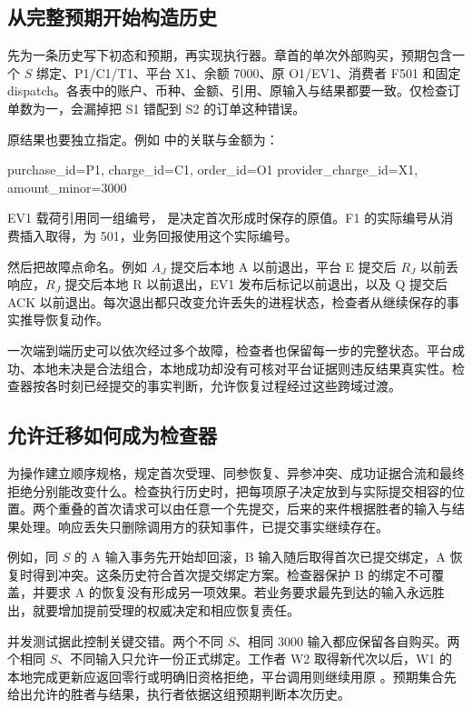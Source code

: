 \subsection*{从完整预期开始构造历史}

先为一条历史写下初态和预期，再实现执行器。章首的单次外部购买，预期包含一个 $S$ 绑定、P1/C1/T1、平台 X1、余额 7000、原 O1/EV1、消费者 F501 和固定 dispatch。各表中的账户、币种、金额、引用、原输入与结果都要一致。仅检查订单数为一，会漏掉把 S1 错配到 S2 的订单这种错误。

原结果也要独立指定。例如  中的关联与金额为：
\begin{BookCode}
purchase_id=P1, charge_id=C1, order_id=O1
provider_charge_id=X1, amount_minor=3000
\end{BookCode}
EV1 载荷引用同一组编号， 是决定首次形成时保存的原值。F1 的实际编号从消费插入取得，为 501，业务回报使用这个实际编号。

然后把故障点命名。例如 $A_J$ 提交后本地 A 以前退出，平台 E 提交后 $R_J$ 以前丢响应，$R_J$ 提交后本地 R 以前退出，EV1 发布后标记以前退出，以及 Q 提交后 ACK 以前退出。每次退出都只改变允许丢失的进程状态，检查者从继续保存的事实推导恢复动作。


一次端到端历史可以依次经过多个故障，检查者也保留每一步的完整状态。平台成功、本地未决是合法组合，本地成功却没有可核对平台证据则违反结果真实性。检查器按各时刻已经提交的事实判断，允许恢复过程经过这些跨域过渡。

\subsection*{允许迁移如何成为检查器}

为操作建立顺序规格，规定首次受理、同参恢复、异参冲突、成功证据合流和最终拒绝分别能改变什么。检查执行历史时，把每项原子决定放到与实际提交相容的位置。两个重叠的首次请求可以由任意一个先提交，后来的来件根据胜者的输入与结果处理。响应丢失只删除调用方的获知事件，已提交事实继续存在。

例如，同 $S$ 的 A 输入事务先开始却回滚，B 输入随后取得首次已提交绑定，A 恢复时得到冲突。这条历史符合首次提交绑定方案。检查器保护 B 的绑定不可覆盖，并要求 A 的恢复没有形成另一项效果。若业务要求最先到达的输入永远胜出，就要增加提前受理的权威决定和相应恢复责任。

并发测试据此控制关键交错。两个不同 $S$、相同 3000 输入都应保留各自购买。两个相同 $S$、不同输入只允许一份正式绑定。工作者 W2 取得新代次以后，W1 的本地完成更新应返回零行或明确旧资格拒绝，平台调用则继续用原 。预期集合先给出允许的胜者与结果，执行者依据这组预期判断本次历史。


